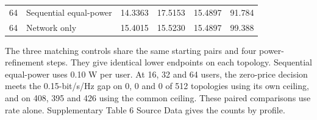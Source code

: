 \documentclass[10pt,letterpaper]{article}
\begin{document}
\begin{table}[p]
\begin{tabular}{llllll}
64 & Sequential equal-power & 14.3363 & 17.5153 & 15.4897 & 91.784\\
64 & Network only & 15.4015 & 15.5230 & 15.4897 & 99.388\\
\bottomrule\end{tabular}
\par\medskip\begin{minipage}{\linewidth}\small
The three matching controls share the same starting pairs and four power-refinement steps. They give identical lower endpoints on each topology. Sequential equal-power uses 0.10 W per user. At 16, 32 and 64 users, the zero-price decision meets the 0.15-bit/s/Hz gap on 0, 0 and 0 of 512 topologies using its own ceiling, and on 408, 395 and 426 using the common ceiling. These paired comparisons use rate alone. Supplementary Table 6 Source Data gives the counts by profile.
\end{minipage}
\end{table}
\end{document}

